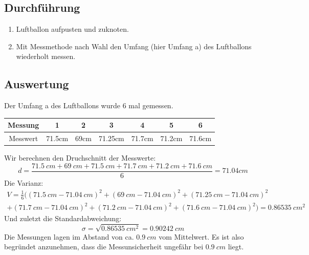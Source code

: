 \documentclass{article}
\begin{document}
        \subsection{Durchführung}
            \begin{enumerate}
                \item Luftballon aufpusten und zuknoten.
                \item Mit Messmethode nach Wahl den Umfang (hier Umfang a) des Luftballons wiederholt messen.
            \end{enumerate}
        \subsection{Auswertung}
            Der Umfang a des Luftballons wurde 6 mal gemessen.
            \begin{center}
                \begin{tabular}{c c c c c c c}
                    Messung & 1 & 2 & 3 & 4 & 5 & 6 \\
                    \midrule
                    Messwert & 71.5cm & 69cm & 71.25cm & 71.7cm & 71.2cm & 71.6cm \\
                    
                \end{tabular}    
            \end{center}
        Wir berechnen den Druchschnitt der Messwerte:
        \[ d = \frac{ \SI{71.5}{cm} + \SI{69}{cm} + \SI{71.5}{cm} + \SI{71.7}{cm} + \SI{71.2}{cm} + \SI{71.6}{cm} }{ 6 }  = 71.04cm\]
        Die Varianz:
        \begin{gather*}
            V = \frac{1}{6} ( {( \SI{71.5}{cm} - \SI{71.04}{cm} )}^2 + {( \SI{69}{cm} - \SI{71.04}{cm} )}^2 + {( \SI{71.25}{cm} - \SI{71.04}{cm} )}^2 \\
               + {( \SI{71.7}{cm} - \SI{71.04}{cm} )}^2 + {( \SI{71.2}{cm} - \SI{71.04}{cm} )}^2 + {( \SI{71.6}{cm} - \SI{71.04}{cm} )}^2 )
             = \SI{0.86535}{{cm}^2}
        \end{gather*} 
        Und zuletzt die Standardabweichung:
        \[ \sigma = \sqrt{\SI{0.86535}{{cm}^2}}  = \SI{0.90242}{cm} \]
        Die Messungen lagen im Abstand von ca. \(\SI{0.9}{cm}\) vom Mittelwert.
        Es ist also begründet anzunehmen, dass die Messunsicherheit ungefähr bei \(\SI{0.9}{cm}\) liegt. \cite{Standardabweichung}
    
\end{document}

